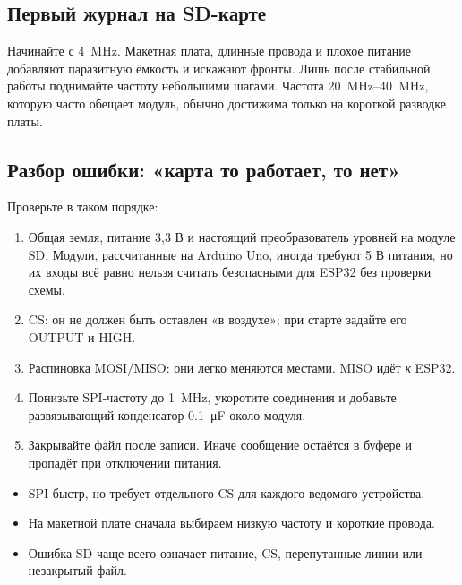 \subsection{Первый журнал на SD-карте}


Начинайте с \SI{4}{MHz}. Макетная плата, длинные провода и плохое питание добавляют паразитную
ёмкость и искажают фронты. Лишь после стабильной работы поднимайте частоту небольшими шагами.
Частота \SIrange{20}{40}{MHz}, которую часто обещает модуль, обычно достижима только на короткой
разводке платы.

\subsection{Разбор ошибки: «карта то работает, то нет»}

Проверьте в таком порядке:
\begin{enumerate}
  \item Общая земля, питание 3,3 В и настоящий преобразователь уровней на модуле SD. Модули,
        рассчитанные на Arduino Uno, иногда требуют 5 В питания, но их входы всё равно нельзя
        считать безопасными для ESP32 без проверки схемы.
  \item CS: он не должен быть оставлен «в воздухе»; при старте задайте его OUTPUT и HIGH.
  \item Распиновка MOSI/MISO: они легко меняются местами. MISO идёт \emph{к} ESP32.
  \item Понизьте SPI-частоту до \SI{1}{MHz}, укоротите соединения и добавьте развязывающий
        конденсатор \SI{0.1}{\micro F} около модуля.
  \item Закрывайте файл после записи. Иначе сообщение остаётся в буфере и пропадёт при отключении питания.
\end{enumerate}

\begin{summary}
\begin{itemize}[leftmargin=*]
  \item SPI быстр, но требует отдельного CS для каждого ведомого устройства.
  \item На макетной плате сначала выбираем низкую частоту и короткие провода.
  \item Ошибка SD чаще всего означает питание, CS, перепутанные линии или незакрытый файл.
\end{itemize}
\end{summary}

